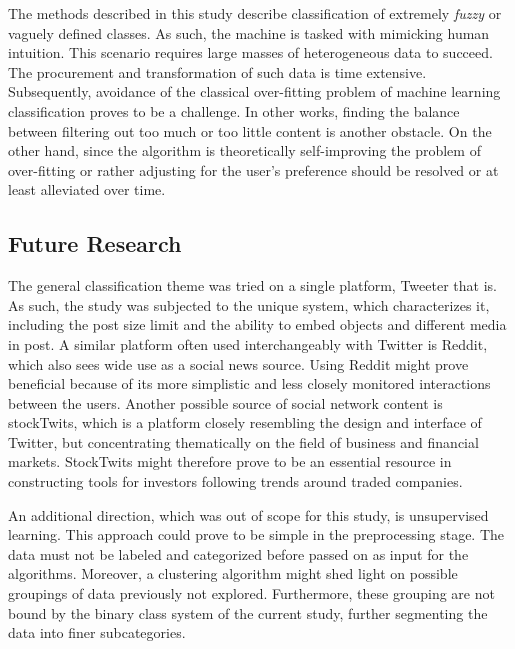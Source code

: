 		\par 
		
		The methods described in this study describe classification of extremely \textit{fuzzy} or vaguely defined classes. As such, the machine is tasked with mimicking human intuition. This scenario requires large masses of heterogeneous data to succeed. The procurement and transformation of such data is time extensive. Subsequently, avoidance of the classical over-fitting problem of machine learning classification proves to be a challenge. In other works, finding the balance between filtering out too much or too little content is another obstacle. On the other hand, since the algorithm is theoretically self-improving the problem of over-fitting or rather adjusting for the user's preference should be resolved or at least alleviated over time. 
		
	\subsection{Future Research}
		The general classification theme was tried on a single platform, Tweeter that is. As such, the study was subjected to the unique system, which characterizes it, including the post size limit and the ability to embed objects and different media in post. A similar platform often used interchangeably with Twitter is Reddit, which also sees wide use as a social news source. Using Reddit might prove beneficial because of its more simplistic and less closely monitored interactions between the users. Another possible source of social network content is stockTwits, which is a platform closely resembling the design and interface of Twitter, but concentrating thematically on the field of business and financial markets. StockTwits might therefore prove to be an essential resource in constructing tools for investors following trends around traded companies.
		
		\par 
		
		An additional direction, which was out of scope for this study, is unsupervised learning. This approach could prove to be simple in the preprocessing stage. The data must not be labeled and categorized before passed on as input for the algorithms. Moreover, a clustering algorithm might shed light on possible groupings of data previously not explored. Furthermore, these grouping are not bound by the binary class system of the current study, further segmenting the data into finer subcategories.
		
